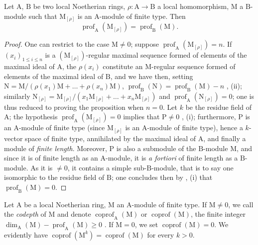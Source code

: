 \begin{proposition}[16.4.8]
\label{0.16.4.8}
Let $\mathrm{A}$, $\mathrm{B}$ be two local Noetherian rings, $\rho:\mathrm{A}\to\mathrm{B}$ a local homomorphism, $\mathrm{M}$ a $\mathrm{B}$-module such that $\mathrm{M}_{[\rho]}$ is an $\mathrm{A}$-module of finite type.
Then
\begin{equation}
\label{0.16.4.8.1}
\tag{16.4.8.1}
  \operatorname{prof}_\mathrm{A}(\mathrm{M}_{[\rho]})=\operatorname{prof}_\mathrm{B}(\mathrm{M}).
\end{equation}
\end{proposition}

\begin{proof}
One can restrict to the case $\mathrm{M}\neq 0$; suppose $\operatorname{prof}_\mathrm{A}(\mathrm{M}_{[\rho]})=n$.
If $(x_i)_{1\leq i\leq n}$ is a $(\mathrm{M}_{[\rho]})$-regular maximal sequence formed of elements of the maximal ideal of $\mathrm{A}$, the $\rho(x_i)$ constitute an $\mathrm{M}$-regular sequence formed of elements of the maximal ideal of $\mathrm{B}$, and we have then, setting $\mathrm{N}=\mathrm{M}/(\rho(x_1)\mathrm{M}+\ldots+\rho(x_n)\mathrm{M})$, $\operatorname{prof}_\mathrm{B}(\mathrm{N})=\operatorname{prof}_\mathrm{B}(\mathrm{M})-n$ , (ii); similarly $\mathrm{N}_{[\rho]}=\mathrm{M}_{[\rho]}/(x_1\mathrm{M}_{[\rho]}+\ldots+x_n\mathrm{M}_{[\rho]})$ and $\operatorname{prof}_\mathrm{A}(\mathrm{N}_{[\rho]})=0$; one is thus reduced to proving the proposition when $n=0$.
Let $k$ be the residue field of $\mathrm{A}$; the hypothesis $\operatorname{prof}_\mathrm{A}(\mathrm{M}_{[\rho]})=0$ implies that $\mathrm{P}\neq 0$ , (i); furthermore, $\mathrm{P}$ is an $\mathrm{A}$-module of finite type (since $\mathrm{M}_{[\rho]}$ is an $\mathrm{A}$-module of finite type), hence a $k$-vector space of finite type, annihilated by the maximal ideal of $\mathrm{A}$, and finally a module of \emph{finite length}.
Moreover, $\mathrm{P}$ is also a submodule of the $\mathrm{B}$-module $\mathrm{M}$, and since it is of finite length as an $\mathrm{A}$-module, it is \emph{a fortiori} of finite length as a $\mathrm{B}$-module.
As it is $\neq 0$, it contains a simple sub-$\mathrm{B}$-module, that is to say one isomorphic to the residue field of $\mathrm{B}$; one concludes then by , (i) that $\operatorname{prof}_\mathrm{B}(\mathrm{M})=0$.
\end{proof}

\begin{definition}[16.4.9]
\label{0.16.4.9}
Let $\mathrm{A}$ be a local Noetherian ring, $\mathrm{M}$ an $\mathrm{A}$-module of finite type.
If $\mathrm{M}\neq 0$, we call the \emph{codepth} of $\mathrm{M}$ and denote $\operatorname{coprof}_\mathrm{A}(\mathrm{M})$ or $\operatorname{coprof}(\mathrm{M})$, the finite integer $\dim_\mathrm{A}(\mathrm{M})-\operatorname{prof}_\mathrm{A}(\mathrm{M})\geq 0$ .
If $\mathrm{M}=0$, we set $\operatorname{coprof}(\mathrm{M})=0$.
We evidently have $\operatorname{coprof}(\mathrm{M}^k)=\operatorname{coprof}(\mathrm{M})$ for every $k>0$.
\end{definition}

